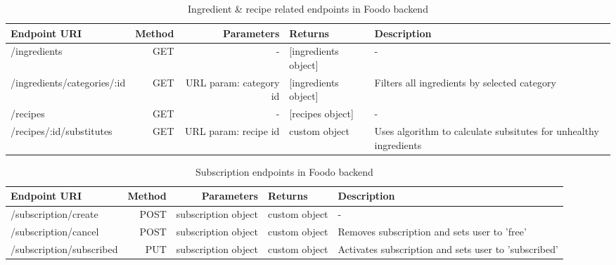 \begin{table}[!ht]
	\hspace{-5pt}
	\begin{scriptsize}
		\begin{tabularx}{\textwidth + 5pt}{| @{\hspace{3pt}} B | @{\hspace{3pt}} N | @{\hspace{3pt}} N | @{\hspace{3pt}} O | @{\hspace{3pt}} H |}
		\hline
		\textbf{Endpoint URI} & \textbf{Method} & \textbf{Parameters} & \textbf{Returns} & \textbf{Description}\\
		\hline
		/ingredients & GET & -  &  [ingredients object] & - \\
		\hline
		/ingredients/categories/:id & GET & URL param: category id  &  [ingredients object] & Filters all ingredients by selected category \\
		\hline
		/recipes & GET & -  &  [recipes object] & - \\
		\hline
		/recipes/:id/substitutes & GET & URL param: recipe id  &  custom object & Uses algorithm to calculate subsitutes for unhealthy ingredients \\
		\hline
	\end{tabularx}
	\end{scriptsize}
	\caption{Ingredient \& recipe related endpoints in Foodo backend}
	\vspace{1em}
\end{table}

\begin{table}[!ht]
	\begin{scriptsize}
	\hspace{-5pt}
	\begin{tabularx}{\textwidth + 5pt}{| @{\hspace{3pt}} B | @{\hspace{3pt}} N | @{\hspace{3pt}} N | @{\hspace{3pt}} O | @{\hspace{3pt}} H |}
		\hline
		\textbf{Endpoint URI} & \textbf{Method} & \textbf{Parameters} & \textbf{Returns} & \textbf{Description}\\
		\hline
		/subscription/create \lockicon & POST & subscription object  &  custom object & - \\
		\hline
		/subscription/cancel \lockicon & POST & subscription object  &  custom object & Removes subscription and sets user to 'free' \\
		\hline
		/subscription/subscribed \lockicon & PUT & subscription object  &  custom object & Activates subscription and sets user to 'subscribed' \\
		\hline
	\end{tabularx}
	\end{scriptsize}
	\caption{Subscription endpoints in Foodo backend}
\end{table}


